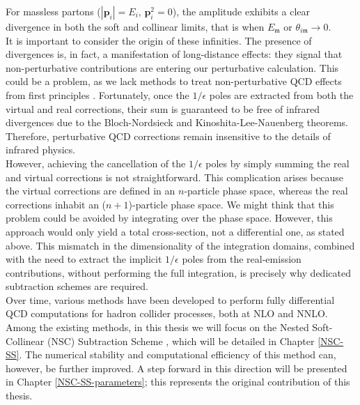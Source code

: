\documentclass[a4paper, 12pt]{book}
\newcommand{\um}{\mathfrak{m}}
\begin{document}
For massless partons ($|\mathbf{p}_i|=E_i, \, \mathbf{p}_i^2=0$), the amplitude exhibits a clear divergence in both the soft and collinear limits, that is when $E_\um$ or $\theta_{i \um} \to 0$.\\
It is important to consider the origin of these infinities. The presence of divergences is, in fact, a manifestation of long-distance effects: they signal that non-perturbative contributions are entering our perturbative calculation. This could be a problem, as we lack methods to treat non-perturbative QCD effects from first principles \cite{Melnikov2018}. Fortunately, once the $1/\epsilon$ poles are extracted from both the virtual and real corrections, their sum is guaranteed to be free of infrared divergences due to the Bloch-Nordsieck \cite{PhysRev.52.54} and Kinoshita-Lee-Nauenberg theorems. Therefore, perturbative QCD corrections remain insensitive to the details of infrared physics. \\
However, achieving the cancellation of the $1/\epsilon$ poles by simply summing the real and virtual corrections is not straightforward. This complication arises because the virtual corrections are defined in an $n$-particle phase space, whereas the real corrections inhabit an ($n+1$)-particle phase space. We might think that this problem could be avoided by integrating over the phase space. However, this approach would only yield a total cross-section, not a differential one, as stated above. This mismatch in the dimensionality of the integration domains, combined with the need to extract the implicit $1/\epsilon$ poles from the real-emission contributions, without performing the full integration, is precisely why dedicated subtraction schemes are required. \\
Over time, various methods have been developed to perform fully differential QCD computations for hadron collider processes, both at NLO and NNLO. Among the existing methods, in this thesis we will focus on the Nested Soft-Collinear (NSC) Subtraction Scheme \cite{Caola:2017dug}, which will be detailed in Chapter \ref{NSC-SS}. The numerical stability and computational efficiency of this method can, however, be further improved. A step forward in this direction will be presented in Chapter \ref{NSC-SS-parameters}; this represents the original contribution of this thesis. 


\clearpage
\end{document}
